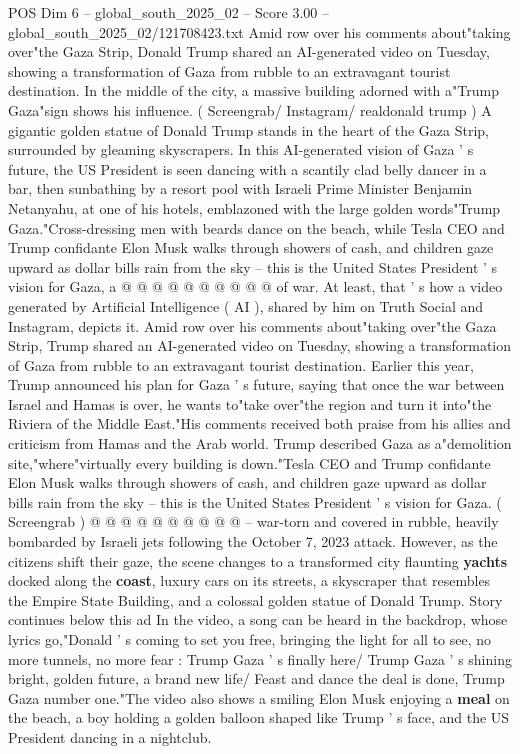 \begin{textsample}{POS Dim 6 – global\_south\_2025\_02 – Score 3.00 – global\_south\_2025\_02/121708423.txt}  \label{ex:f6_pos_406}
Amid row over his comments about"taking over"the Gaza Strip, Donald Trump shared an AI-generated video on Tuesday, showing a transformation of Gaza from rubble to an extravagant tourist destination.
In the middle of the city, a massive building adorned with a"Trump Gaza"sign shows his influence. ( Screengrab/ Instagram/ realdonald trump ) A gigantic golden statue of Donald Trump stands in the heart of the Gaza Strip, surrounded by gleaming skyscrapers.
In this AI-generated vision of Gaza ' s future, the US President is seen dancing with a scantily clad belly dancer in a bar, then sunbathing by a resort pool with Israeli Prime Minister Benjamin Netanyahu, at one of his hotels, emblazoned with the large golden words"Trump Gaza."Cross-dressing men with beards dance on the beach, while Tesla CEO and Trump confidante Elon Musk walks through showers of cash, and children gaze upward as dollar bills rain from the sky -- this is the United States President ' s vision for Gaza, a @ @ @ @ @ @ @ @ @ @ of war.
At least, that ' s how a video generated by Artificial Intelligence ( AI ), shared by him on Truth Social and Instagram, depicts it.
Amid row over his comments about"taking over"the Gaza Strip, Trump shared an AI-generated video on Tuesday, showing a transformation of Gaza from rubble to an extravagant tourist destination.
Earlier this year, Trump announced his plan for Gaza ' s future, saying that once the war between Israel and Hamas is over, he wants to"take over"the region and turn it into"the Riviera of the Middle East."His comments received both praise from his allies and criticism from Hamas and the Arab world.
Trump described Gaza as a"demolition site,"where"virtually every building is down."Tesla CEO and Trump confidante Elon Musk walks through showers of cash, and children gaze upward as dollar bills rain from the sky -- this is the United States President ' s vision for Gaza. ( Screengrab ) @ @ @ @ @ @ @ @ @ @ -- war-torn and covered in rubble, heavily bombarded by Israeli jets following the October 7, 2023 attack.
However, as the citizens shift their gaze, the scene changes to a transformed city flaunting \textbf{yachts} docked along the \textbf{coast}, luxury cars on its streets, a skyscraper that resembles the Empire State Building, and a colossal golden statue of Donald Trump.
Story continues below this ad In the video, a song can be heard in the backdrop, whose lyrics go,"Donald ' s coming to set you free, bringing the light for all to see, no more tunnels, no more fear : Trump Gaza ' s finally here/ Trump Gaza ' s shining bright, golden future, a brand new life/ Feast and dance the deal is done, Trump Gaza number one."The video also shows a smiling Elon Musk enjoying a \textbf{meal} on the beach, a boy holding a golden balloon shaped like Trump ' s face, and the US President dancing in a nightclub.

\end{textsample}
